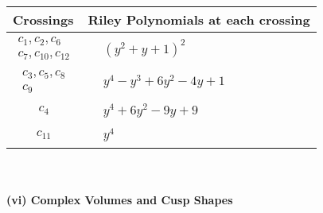 \documentclass[1p]{elsarticle_modified}
\theoremstyle{definition}
\begin{document}
\begin{tabular}{m{50pt}|m{274pt}}
Crossings & \hspace{64pt}Riley Polynomials at each crossing \\
\hline $$\begin{aligned}c_{1},c_{2},c_{6}\\c_{7},c_{10},c_{12}\end{aligned}$$&$\begin{aligned}
&(y^2+y+1)^2
\end{aligned}$\\
\hline $$\begin{aligned}c_{3},c_{5},c_{8}\\c_{9}\end{aligned}$$&$\begin{aligned}
&y^4- y^3+6 y^2-4 y+1
\end{aligned}$\\
\hline $$\begin{aligned}c_{4}\end{aligned}$$&$\begin{aligned}
&y^4+6 y^2-9 y+9
\end{aligned}$\\
\hline $$\begin{aligned}c_{11}\end{aligned}$$&$\begin{aligned}
&y^4
\end{aligned}$\\
\hline
\end{tabular}\\~\\
\newpage\flushleft \textbf{(vi) Complex Volumes and Cusp Shapes}
\end{document}
